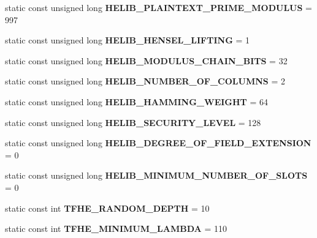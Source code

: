 \begin{DoxyCompactItemize}
\item 
\mbox{\label{classhomomorphine_1_1_constants_a25426ff47774d7ff0b88a0f7af1cfbb5}} 
static const unsigned long {\bfseries H\+E\+L\+I\+B\+\_\+\+P\+L\+A\+I\+N\+T\+E\+X\+T\+\_\+\+P\+R\+I\+M\+E\+\_\+\+M\+O\+D\+U\+L\+US} = 997
\item 
\mbox{\label{classhomomorphine_1_1_constants_a1392b13d6e1546225b95928311e53e85}} 
static const unsigned long {\bfseries H\+E\+L\+I\+B\+\_\+\+H\+E\+N\+S\+E\+L\+\_\+\+L\+I\+F\+T\+I\+NG} = 1
\item 
\mbox{\label{classhomomorphine_1_1_constants_a0dff16e6343989a60f4833605e45525f}} 
static const unsigned long {\bfseries H\+E\+L\+I\+B\+\_\+\+M\+O\+D\+U\+L\+U\+S\+\_\+\+C\+H\+A\+I\+N\+\_\+\+B\+I\+TS} = 32
\item 
\mbox{\label{classhomomorphine_1_1_constants_af08d97d4333bf772d742dddb6cac3af7}} 
static const unsigned long {\bfseries H\+E\+L\+I\+B\+\_\+\+N\+U\+M\+B\+E\+R\+\_\+\+O\+F\+\_\+\+C\+O\+L\+U\+M\+NS} = 2
\item 
\mbox{\label{classhomomorphine_1_1_constants_a86e3b8595c5ea2ed0be83f454dcc22d9}} 
static const unsigned long {\bfseries H\+E\+L\+I\+B\+\_\+\+H\+A\+M\+M\+I\+N\+G\+\_\+\+W\+E\+I\+G\+HT} = 64
\item 
\mbox{\label{classhomomorphine_1_1_constants_a043276f012d91267f62249aee29dfc04}} 
static const unsigned long {\bfseries H\+E\+L\+I\+B\+\_\+\+S\+E\+C\+U\+R\+I\+T\+Y\+\_\+\+L\+E\+V\+EL} = 128
\item 
\mbox{\label{classhomomorphine_1_1_constants_aac8aee7a978989ff544b02f8534fff24}} 
static const unsigned long {\bfseries H\+E\+L\+I\+B\+\_\+\+D\+E\+G\+R\+E\+E\+\_\+\+O\+F\+\_\+\+F\+I\+E\+L\+D\+\_\+\+E\+X\+T\+E\+N\+S\+I\+ON} = 0
\item 
\mbox{\label{classhomomorphine_1_1_constants_a94ae2d93d643d610ef822f8a06dde37f}} 
static const unsigned long {\bfseries H\+E\+L\+I\+B\+\_\+\+M\+I\+N\+I\+M\+U\+M\+\_\+\+N\+U\+M\+B\+E\+R\+\_\+\+O\+F\+\_\+\+S\+L\+O\+TS} = 0
\item 
\mbox{\label{classhomomorphine_1_1_constants_aa8ea7bb198826c9458fe8b975c1dcd64}} 
static const int {\bfseries T\+F\+H\+E\+\_\+\+R\+A\+N\+D\+O\+M\+\_\+\+D\+E\+P\+TH} = 10
\item 
\mbox{\label{classhomomorphine_1_1_constants_a8581d42bf2a8ffa81c2760f7fdd3c8a3}} 
static const int {\bfseries T\+F\+H\+E\+\_\+\+M\+I\+N\+I\+M\+U\+M\+\_\+\+L\+A\+M\+B\+DA} = 110
\end{DoxyCompactItemize}


